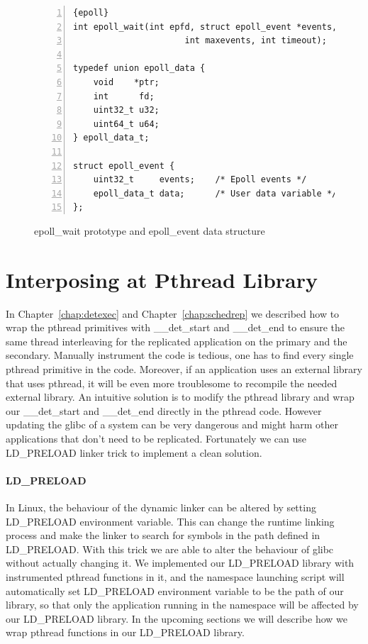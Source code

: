 \begin{figure}
\begin{lstlisting}[numbers=left, frame=single, basicstyle=\small, breaklines]{epoll}
int epoll_wait(int epfd, struct epoll_event *events,
                      int maxevents, int timeout);

typedef union epoll_data {
    void    *ptr;
    int      fd;
    uint32_t u32;
    uint64_t u64;
} epoll_data_t;

struct epoll_event {
    uint32_t     events;    /* Epoll events */
    epoll_data_t data;      /* User data variable */
};

\end{lstlisting}
\caption{epoll\_wait prototype and epoll\_event data structure}
\label{f:epoll}
\end{figure}

\section{Interposing at Pthread Library} \label{chap:library}
In Chapter~\ref{chap:detexec} and Chapter~\ref{chap:schedrep} we described how to wrap the pthread primitives with \_\_det\_start and \_\_det\_end to ensure the same thread interleaving for the replicated application on the primary and the secondary. Manually instrument the code is tedious, one has to find every single pthread primitive in the code. Moreover, if an application uses an external library that uses pthread, it will be even more troublesome to recompile the needed external library. An intuitive solution is to modify the pthread library and wrap our \_\_det\_start and \_\_det\_end directly in the pthread code. However updating the glibc of a system can be very dangerous and might harm other applications that don't need to be replicated. Fortunately we can use LD\_PRELOAD linker trick to implement a clean solution.

\paragraph{LD\_PRELOAD}
In Linux, the behaviour of the dynamic linker can be altered by setting LD\_PRELOAD environment variable. This can change the runtime linking process and make the linker to search for symbols in the path defined in LD\_PRELOAD. With this trick we are able to alter the behaviour of glibc without actually changing it. We implemented our LD\_PRELOAD library with instrumented pthread functions in it, and the namespace launching script will automatically set LD\_PRELOAD environment variable to be the path of our library, so that only the application running in the namespace will be affected by our LD\_PRELOAD library. In the upcoming sections we will describe how we wrap pthread functions in our LD\_PRELOAD library.

